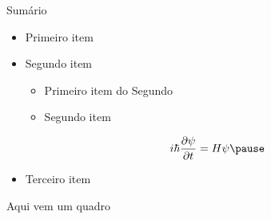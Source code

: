 \begin{slide}[toc=]{Sumário}

\begin{itemize}
   \item Primeiro item \pause
   \item Segundo item  \pause
   \begin{itemize}
      \item Primeiro item do Segundo \pause
      \item Segundo item  \pause
   \end{itemize}

\begin{equation}
   i \hbar \frac{\partial \psi}{\partial t} = H \psi \pause
\end{equation}

   \item Terceiro item \pause
\end{itemize}

\begin{nota}
 Aqui vem um quadro
\end{nota}


\end{slide}
